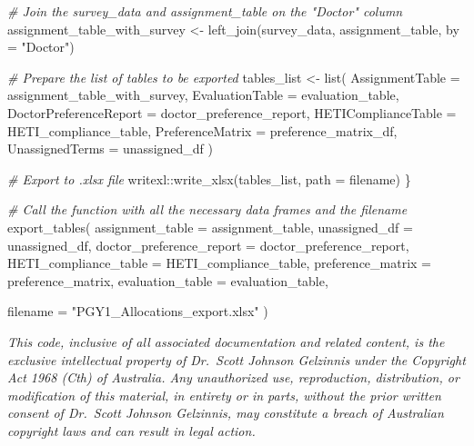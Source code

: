 \documentclass[
]{article}
\newenvironment{Shaded}{\begin{snugshade}}{\end{snugshade}}
\newcommand{\AttributeTok}[1]{\textcolor[rgb]{0.77,0.63,0.00}{#1}}
\newcommand{\CommentTok}[1]{\textcolor[rgb]{0.56,0.35,0.01}{\textit{#1}}}
\newcommand{\FunctionTok}[1]{\textcolor[rgb]{0.00,0.00,0.00}{#1}}
\newcommand{\NormalTok}[1]{#1}
\newcommand{\OtherTok}[1]{\textcolor[rgb]{0.56,0.35,0.01}{#1}}
\newcommand{\SpecialCharTok}[1]{\textcolor[rgb]{0.00,0.00,0.00}{#1}}
\newcommand{\StringTok}[1]{\textcolor[rgb]{0.31,0.60,0.02}{#1}}
\begin{document}
\begin{Shaded}
\begin{Highlighting}[]
  \CommentTok{\# Join the survey\_data and assignment\_table on the "Doctor" column}
\NormalTok{  assignment\_table\_with\_survey }\OtherTok{\textless{}{-}} \FunctionTok{left\_join}\NormalTok{(survey\_data, assignment\_table, }\AttributeTok{by =} \StringTok{"Doctor"}\NormalTok{)}
  
  \CommentTok{\# Prepare the list of tables to be exported}
\NormalTok{  tables\_list }\OtherTok{\textless{}{-}} \FunctionTok{list}\NormalTok{(}
    \AttributeTok{AssignmentTable =}\NormalTok{ assignment\_table\_with\_survey,}
    \AttributeTok{EvaluationTable =}\NormalTok{ evaluation\_table,}
    \AttributeTok{DoctorPreferenceReport =}\NormalTok{ doctor\_preference\_report,}
    \AttributeTok{HETIComplianceTable =}\NormalTok{ HETI\_compliance\_table,}
    \AttributeTok{PreferenceMatrix =}\NormalTok{ preference\_matrix\_df,}
    \AttributeTok{UnassignedTerms =}\NormalTok{ unassigned\_df}
\NormalTok{  )}
  
  \CommentTok{\# Export to .xlsx file}
\NormalTok{  writexl}\SpecialCharTok{::}\FunctionTok{write\_xlsx}\NormalTok{(tables\_list, }\AttributeTok{path =}\NormalTok{ filename)}
\NormalTok{\}}

\CommentTok{\# Call the function with all the necessary data frames and the filename}
\FunctionTok{export\_tables}\NormalTok{(}
  \AttributeTok{assignment\_table =}\NormalTok{ assignment\_table,}
  \AttributeTok{unassigned\_df =}\NormalTok{ unassigned\_df,}
  \AttributeTok{doctor\_preference\_report =}\NormalTok{ doctor\_preference\_report,}
  \AttributeTok{HETI\_compliance\_table =}\NormalTok{ HETI\_compliance\_table,}
  \AttributeTok{preference\_matrix =}\NormalTok{ preference\_matrix,}
  \AttributeTok{evaluation\_table =}\NormalTok{ evaluation\_table,}
  
  \AttributeTok{filename =} \StringTok{"PGY1\_Allocations\_export.xlsx"}
\NormalTok{)}
\end{Highlighting}
\end{Shaded}

\emph{This code, inclusive of all associated documentation and related
content, is the exclusive intellectual property of Dr.~Scott Johnson
Gelzinnis under the Copyright Act 1968 (Cth) of Australia. Any
unauthorized use, reproduction, distribution, or modification of this
material, in entirety or in parts, without the prior written consent of
Dr.~Scott Johnson Gelzinnis, may constitute a breach of Australian
copyright laws and can result in legal action.}
\end{document}
